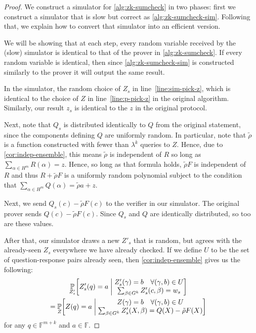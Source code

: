 \documentclass[english,12pt]{reedthesis}
\theoremstyle{plain}
\theoremstyle{definition}
\theoremstyle{remark}
\newcommand{\middlemid}{%
  \ensuremath{\;\middle\vert\;}
}
\begin{document}
\begin{proof}
  We construct a simulator for \cref{alg:zk-sumcheck} in two phases: first we
  construct a simulator that is slow but correct as \cref{alg:zk-sumcheck-sim}.
  Following that, we explain how to convert that simulator into an efficient
  version.

  We will be showing that at each step, every random variable received by the
  (slow) simulator is identical to that of the prover in \cref{alg:zk-sumcheck}.
  If every random variable is identical, then since \cref{alg:zk-sumcheck-sim}
  is constructed similarly to the prover it will output the same result.

  In the simulator, the random choice of $Z_{s}$ in line~\ref{line:sim-pick-z},
  which is identical to the choice of $Z$ in line~\ref{line:p-pick-z} in the
  original algorithm. Similarly, our result $z_{s}$ is identical to the $z$ in
  the original protocol.

  Next, note that $Q_{s}$ is distributed identically to $Q$ from the original
  statement, since the components defining $Q$ are uniformly random. In
  particular, note that $\tilde{\rho}$ is a function constructed with fewer than
  $\lambda^{k}$ queries to $Z$. Hence, due to \cref{cor:indep-ensemble}, this means
  $\tilde{\rho}$ is independent of $R$ so long as $\sum_{\alpha \in H^{m}}R(\alpha) = z$. Hence,
  so long as that formula holds, $\tilde{\rho}F$ is independent of $R$ and thus
  $R + \tilde{\rho}F$ is a uniformly random polynomial subject to the condition
  that $\sum_{\alpha \in H^{m}}Q(\alpha) = \tilde{\rho}a + z$.

  Next, we send $Q_{s}(c) - \tilde{\rho}F(c)$ to the verifier in our simulator. The
  original prover sends $Q(c) - \tilde{\rho}F(c)$. Since $Q_{s}$ and $Q$ are
  identically distributed, so too are these values.

  After that, our simulator draws a new $Z'_{s}$ that is random, but agrees with
  the already-seen $Z_{s}$ everywhere we have already checked. If we define $U$
  to be the set of question-response pairs already seen, then
  \cref{cor:indep-ensemble} gives us the following:
  \begin{multline}\label{eqn:z-query-dist}
    \underset{Z'_{s}}{\mathbb{P}}\mleft[
      Z'_{s}(q) = a \middlemid
      \begin{matrix}
        Z'_{s}(\gamma) = b \quad \forall (\gamma, b) \in U \\
        \sum_{\beta \in G^{k}}Z'_{s}(c, \beta) = w_{s}
      \end{matrix}
    \mright] \\
    = \underset{Z}{\mathbb{P}}\mleft[
      Z(q) = a \middlemid
      \begin{matrix}
        Z(\gamma) = b \quad \forall (\gamma, b) \in U \\
        \sum_{\beta \in G^{k}}Z'_{s}(X, \beta) = Q(X) - \tilde{\rho}F(X)
      \end{matrix}
    \mright]
  \end{multline}
  for any $q \in \mathbb{F}^{m+k}$ and $a \in \mathbb{F}$.


\end{proof}
\end{document}
